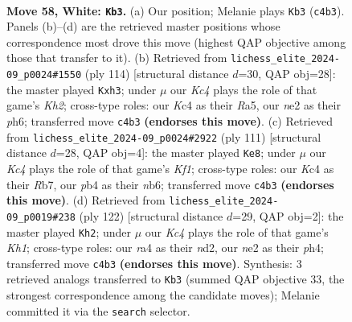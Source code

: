 \documentclass[11pt]{article}
\begin{document}
\clearpage

\begin{figure}[p]\centering
\begin{subfigure}{0.46\textwidth}\centering
\resizebox{\linewidth}{!}{%
\newchessgame
\chessboard[
  setfen={8/7p/5k2/4p3/rpK3b1/8/4n1r1/8 w - - 6 58},
  showmover=false,
  pgfstyle=straightmove, color=movearrow, markmove={c4-b3}
]}
\caption{}
\end{subfigure}\hfill
\begin{subfigure}{0.46\textwidth}\centering
\resizebox{\linewidth}{!}{%
\newchessgame
\chessboard[
  setfen={8/6k1/7p/R7/p5r1/7p/7K/8 w - - 2 58},
  showmover=false,
  pgfstyle=straightmove, color=movearrow, markmove={h2-h3}
]}
\caption{}
\end{subfigure}
\\[4pt]
\begin{subfigure}{0.46\textwidth}\centering
\resizebox{\linewidth}{!}{%
\newchessgame
\chessboard[
  setfen={5k2/1r6/1NR1PK2/p7/P7/8/7P/8 b - - 0 56},
  showmover=false,
  pgfstyle=straightmove, color=movearrow, markmove={f8-e8}
]}
\caption{}
\end{subfigure}\hfill
\begin{subfigure}{0.46\textwidth}\centering
\resizebox{\linewidth}{!}{%
\newchessgame
\chessboard[
  setfen={4R3/6k1/8/6b1/7p/4p1r1/3n4/7K w - - 2 62},
  showmover=false,
  pgfstyle=straightmove, color=movearrow, markmove={h1-h2}
]}
\caption{}
\end{subfigure}
\caption{\textbf{Move 58, White: \texttt{Kb3}.} (a) Our position; Melanie plays \texttt{Kb3} (\texttt{c4b3}). Panels (b)--(d) are the retrieved master positions whose correspondence most drove this move (highest QAP objective among those that transfer to it). (b) Retrieved from \texttt{lichess\_elite\_2024-09\_p0024\#1550} (ply 114) [structural distance $d$=30, QAP obj=28]: the master played \texttt{Kxh3}; under $\mu$ our \emph{Kc4} plays the role of that game's \emph{Kh2}; cross-type roles: our \emph{K}c4 as their \emph{R}a5, our \emph{n}e2 as their \emph{p}h6; transferred move \texttt{c4b3} \textbf{(endorses this move)}. (c) Retrieved from \texttt{lichess\_elite\_2024-09\_p0024\#2922} (ply 111) [structural distance $d$=28, QAP obj=4]: the master played \texttt{Ke8}; under $\mu$ our \emph{Kc4} plays the role of that game's \emph{Kf1}; cross-type roles: our \emph{K}c4 as their \emph{R}b7, our \emph{p}b4 as their \emph{n}b6; transferred move \texttt{c4b3} \textbf{(endorses this move)}. (d) Retrieved from \texttt{lichess\_elite\_2024-09\_p0019\#238} (ply 122) [structural distance $d$=29, QAP obj=2]: the master played \texttt{Kh2}; under $\mu$ our \emph{Kc4} plays the role of that game's \emph{Kh1}; cross-type roles: our \emph{r}a4 as their \emph{n}d2, our \emph{n}e2 as their \emph{p}h4; transferred move \texttt{c4b3} \textbf{(endorses this move)}. Synthesis: 3 retrieved analogs transferred to \texttt{Kb3} (summed QAP objective 33, the strongest correspondence among the candidate moves); Melanie committed it via the \texttt{search} selector.}
\label{fig:thought-m114}
\end{figure}
\end{document}

